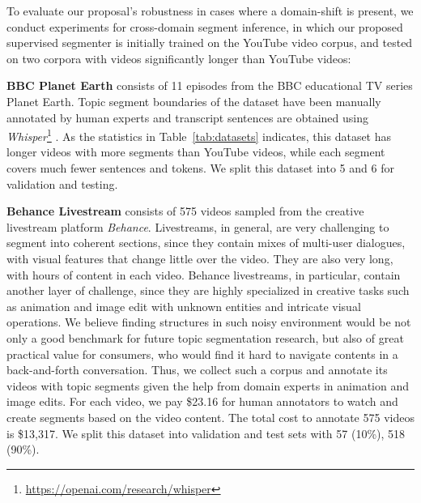 \documentclass[runningheads]{llncs}
\begin{document}
To evaluate our proposal's robustness in cases where a domain-shift is present, 
we conduct experiments for cross-domain segment inference, in which our proposed supervised segmenter is initially trained on the %
YouTube video corpus, and tested on two corpora %
with videos significantly longer than YouTube videos:

\vspace{0.5ex}
\noindent
\textbf{BBC Planet Earth} \cite{Lorenzo-etal-2015} consists of 11 episodes from the BBC educational TV series Planet Earth. Topic segment boundaries of the dataset have been manually annotated by human experts and transcript sentences are obtained using \textit{Whisper}\footnote{\url{https://openai.com/research/whisper}} \cite{radford2022robust}. 
As the statistics in Table~\ref{tab:datasets} indicates, this dataset has longer videos with more segments than YouTube videos, while each segment covers much fewer sentences and tokens.
We split this dataset into 5 and 6 for validation and testing.

\vspace{0.5ex}
\noindent
\textbf{Behance Livestream} consists of 575 videos sampled from the creative livestream 
platform \textit{Behance}. Livestreams, in general, are very challenging to segment into 
coherent sections, since they contain mixes of multi-user dialogues, with 
visual features that change little over the video. They are also very long, with 
hours of content in each video. Behance livestreams, in particular, contain another layer of challenge, 
since they are highly specialized in creative tasks such as animation and image 
edit with unknown entities and intricate visual operations. We believe finding structures in such noisy environment would be not only a good 
benchmark for future topic segmentation research, but also of great practical 
value for consumers, who would find it hard to navigate contents in a back-and-forth 
conversation. Thus, we collect such a corpus and annotate its videos with topic segments given the help from domain experts in animation 
and image edits. For each video, we pay \$23.16 for human annotators to watch and create segments based on the video content. The total cost to annotate 575 videos is \$13,317. We split this dataset into validation and test sets with 57 (10\%), 518 (90\%).
\end{document}
